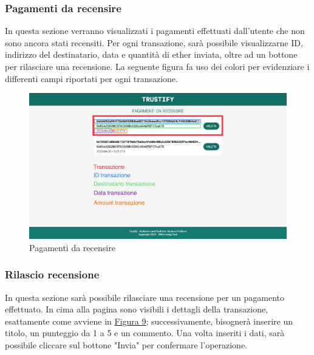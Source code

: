 \subsubsection{Pagamenti da recensire}
In questa sezione verranno visualizzati i pagamenti effettuati dall'utente che non sono ancora stati recensiti. Per ogni transazione, sarà possibile visualizzarne ID, indirizzo del destinatario, data e quantità di ether inviata, oltre ad un bottone per rilasciare una recensione. La seguente figura fa uso dei colori per evidenziare i differenti campi riportati per ogni transazione.
\begin{figure}
    \centering
    \includegraphics[scale=0.18]{src/img/pagamenti.jpg}
    \caption[Pagamenti da recensire]{Pagamenti da recensire\protect\footnotemark}\label{fig:pagamenti}
\end{figure}


\subsubsection{Rilascio recensione}
In questa sezione sarà possibile rilasciare una recensione per un pagamento effettuato. In cima alla pagina sono visibili i dettagli della transazione, esattamente come avviene in \hyperref[fig:pagamenti]{Figura 9}; successivamente, bisognerà inserire un titolo, un punteggio da 1 a 5 e un commento. Una volta inseriti i dati, sarà possibile cliccare sul bottone "Invia" per confermare l'operazione.

